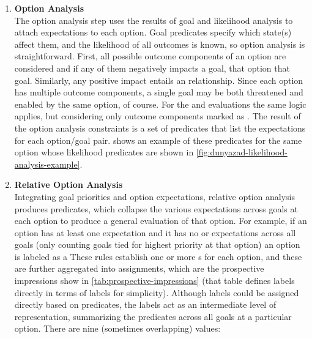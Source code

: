 \begin{enumerate}[leftmargin=1.4em]
\item %
\textbf{Option Analysis} \\
\label{page:option-analysis}%
%
The option analysis step uses the results of goal and likelihood analysis to attach expectations to each option.
%
Goal predicates specify which state(s) affect them, and the likelihood of all outcomes is known, so option analysis is straightforward.
%
First, all possible outcome components of an option are considered and if any of them negatively impacts a goal, that option  that goal.
%
Similarly, any positive impact entails an  relationship.
%
Since each option has multiple outcome components, a single goal may be both threatened and enabled by the same option, of course.
%
For the  and  evaluations the same logic applies, but considering only outcome components marked as .
%
The result of the option analysis constraints is a set of  predicates that list the expectations for each option/goal pair.
%
 shows an example of these  predicates for the same option whose likelihood predicates are shown in \cref{fig:dunyazad-likelihood-analysis-example}.

\item %
\textbf{Relative Option Analysis} \\
%
Integrating goal priorities and option expectations, relative option analysis produces  predicates, which collapse the various expectations across goals at each option to produce a general evaluation of that option.
%
For example, if an option has at least one  expectation and it has no  or  expectations across all goals (only counting goals tied for highest priority at that option) an option is labeled as a 
%
These rules establish one or more s for each option, and these are further aggregated into  assignments, which are the prospective impressions show in \cref{tab:prospective-impressions} (that table defines  labels directly in terms of  labels for simplicity).
%
Although  labels could be assigned directly based on  predicates, the  labels act as an intermediate level of representation, summarizing the  predicates across all goals at a particular option.
%
There are nine (sometimes overlapping)  values:


\end{enumerate}
